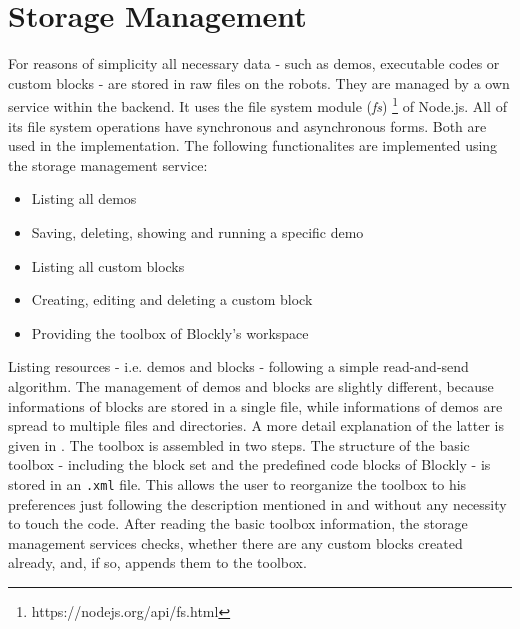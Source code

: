 \begin{figure}[htbp]
	
\end{figure}

\section{Storage Management}
For reasons of simplicity all necessary data - such as demos, executable codes or custom blocks - are stored in raw files on the robots. They are managed by a own service within the backend. It uses the file system module (\textit{fs}) \footnote{https://nodejs.org/api/fs.html} of Node.js. All of its file system operations have synchronous and asynchronous forms. Both are used in the implementation. The following functionalites are implemented using the storage management service:

\begin{itemize}
    \item Listing all demos
    \item Saving, deleting, showing and running a specific demo
    \item Listing all custom blocks
    \item Creating, editing and deleting a custom block
    \item Providing the toolbox of Blockly's workspace
\end{itemize}

Listing resources - i.e. demos and blocks - following a simple read-and-send algorithm. The management of demos and blocks are slightly different, because informations of blocks are stored in a single file, while informations of demos are spread to multiple files and directories. A more detail explanation of the latter is given in . The toolbox is assembled in two steps. The structure of the basic toolbox - including the \hobbit{} block set and the predefined code blocks of Blockly - is stored in an \lstinline!.xml! file. This allows the user to reorganize the toolbox to his preferences just following the description mentioned in  and without any necessity to touch the code. After reading the basic toolbox information, the storage management services checks, whether there are any custom blocks created already, and, if so, appends them to the toolbox.

